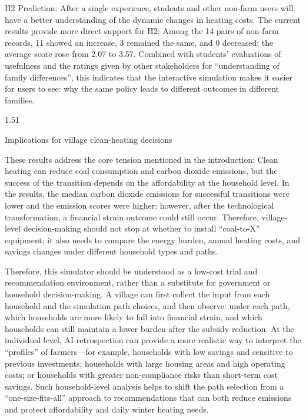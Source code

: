 \documentclass[stu,12pt,floatsintext,donotrepeattitle]{apa7}
\makeatletter
\newcommand{\Sihao}{\fontsize{14pt}{18pt}\selectfont}
\renewcommand{\subsection}{\@startsection{subsection}{2}{\z@}%
  {1.5\baselineskip}{1\baselineskip}%
  {\normalfont\Sihao\bfseries\raggedright}}
\makeatother
\begin{document}
H2 Prediction: After a single experience, students and other non-farm users will have a better understanding of the dynamic changes in heating costs. The current results provide more direct support for H2: Among the 14 pairs of non-farm records, 11 showed an increase, 3 remained the same, and 0 decreased; the average score rose from 2.07 to 3.57. Combined with students' evaluations of usefulness and the ratings given by other stakeholders for ``understanding of family differences'', this indicates that the interactive simulation makes it easier for users to see: why the same policy leads to different outcomes in different families.

\subsection{Implications for village clean-heating decisions}

These results address the core tension mentioned in the introduction: Clean heating can reduce coal consumption and carbon dioxide emissions, but the success of the transition depends on the affordability at the household level. In the results, the median carbon dioxide emissions for successful transitions were lower and the emission scores were higher; however, after the technological transformation, a financial strain outcome could still occur. Therefore, village-level decision-making should not stop at whether to install ``coal-to-X'' equipment; it also needs to compare the energy burden, annual heating costs, and savings changes under different household types and paths.

Therefore, this simulator should be understood as a low-cost trial and recommendation environment, rather than a substitute for government or household decision-making. A village can first collect the input from each household and the simulation path choices, and then observe: under each path, which households are more likely to fall into financial strain, and which households can still maintain a lower burden after the subsidy reduction. At the individual level, AI retrospection can provide a more realistic way to interpret the ``profiles'' of farmers---for example, households with low savings and sensitive to previous investments; households with large housing areas and high operating costs; or households with greater non-compliance risks than short-term cost savings. Such household-level analysis helps to shift the path selection from a ``one-size-fits-all'' approach to recommendations that can both reduce emissions and protect affordability and daily winter heating needs.
\end{document}
